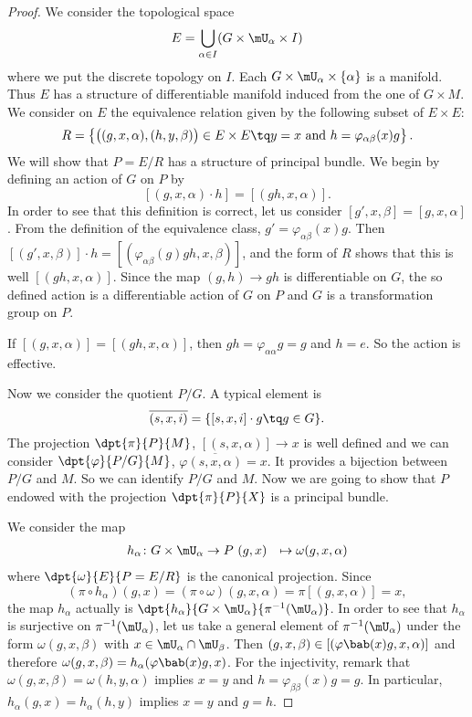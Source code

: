 \begin{proof}
We consider the topological space 
\begin{equation}
    E=\bigcup_{\alpha\in I}(G\times\mU_{\alpha}\times I)
\end{equation}
where we put the discrete topology on $I$. Each $G\times\mU_{\alpha}\times\{\alpha\}$ is a manifold. Thus $E$ has a structure of differentiable manifold induced from the one of $G\times M$. We consider on $E$ the equivalence relation given by the following subset of $E\times E$:
\[
   R=\left\{\big(  (g,x,\alpha),(h,y,\beta)\big)\in E\times E\tq y=x\text{ and }  h=\varphi_{\alpha\beta}(x)g \right\}.
\]
We will show that $P=E/R$ has a structure of principal bundle. We begin by defining an action of $G$ on $P$ by
\[
  [ (g,x,\alpha)\cdot h ]=[ (gh,x,\alpha) ].
\]
In order to see that this definition is correct, let us consider $[g',x,\beta]=[g,x,\alpha]$. From the definition of the equivalence class, $g'=\varphi_{\alpha\beta}(x)g$. Then $[(g',x,\beta)]\cdot h=[(\varphi_{\alpha\beta}(g)gh,x,\beta)]$, and the form of $R$ shows that this is well $[(gh,x,\alpha)]$. Since the map $(g,h)\to gh$ is differentiable on $G$, the so defined action is a differentiable action of $G$ on $P$ and $G$ is a transformation group on $P$.

If $[(g,x,\alpha)]=[(gh,x,\alpha)]$, then $gh=\varphi_{\alpha\alpha}g=g$ and $h=e$. So the action is effective. 

Now we consider the quotient $P/G$. A typical element is
\[
   \overline{ (s,x,i) }=\{ [s,x,i]\cdot g\tq g\in G \}.
\]
The projection $\dpt{\pi}{P}{M}$, $[(s,x,\alpha)]\to x$ is well defined and we can consider $\dpt{\varphi}{P/G}{M}$, $\varphi\overline{(s,x,\alpha)}=x$. It provides a bijection between $P/G$ and $M$. So we can identify $P/G$ and $M$. Now we are going to show that $P$ endowed with the projection $\dpt{\pi}{P}{X}$ is a principal bundle. 

We consider the map 
		\begin{equation}
		\begin{aligned}
			h_{\alpha} \colon G\times\mU_{\alpha} &\to P\
			(g,x)&\mapsto \omega(g,x,\alpha)
		\end{aligned}
	\end{equation}	
%
where $\dpt{\omega}{E}{P=E/R}$ is the canonical projection. Since 
\[
  (\pi\circ h_{\alpha})(g,x)=(\pi\circ\omega)(g,x,\alpha)=\pi[(g,x,\alpha)]=x,
\]
the map $h_{\alpha}$ actually is $\dpt{h_{\alpha}}{G\times\mU_{\alpha}}{\pi^{-1}(\mU_{\alpha})}$. In order to see that $h_{\alpha}$ is surjective on $\pi^{-1}(\mU_{\alpha})$, let us take a general element of $\pi^{-1}(\mU_{\alpha})$ under the form $\omega(g,x,\beta)$ with $x\in\mU_{\alpha}\cap\mU_{\beta}$. Then $(g,x,\beta)\in[ (\varphi\bab(x)g,x,\alpha) ]$ and therefore $\omega(g,x,\beta)=h_{\alpha}(\varphi\bab(x)g,x)$. For the injectivity, remark that $\omega(g,x,\beta)=\omega(h,y,\alpha)$ implies $x=y$ and $h=\varphi_{\beta\beta}(x)g=g$. In particular, $h_{\alpha}(g,x)=h_{\alpha}(h,y)$ implies $x=y$ and $g=h$.


\end{proof}
